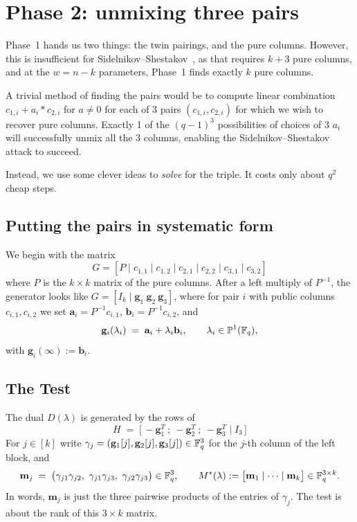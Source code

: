 \section{Phase 2: unmixing three pairs}\label{sec:fastp2}

Phase~1 hands us two things: the twin
pairings, and the pure columns. However, this is insufficient for Sidelnikov--Shestakov~\cite{sidelnikov1992insecurity}, 
as that requires $k+3$ pure columns, and at the $w=n-k$ parameters, Phase~1 finds exactly $k$
pure columns. 

A trivial method of finding the pairs would be to compute linear combination $c_{1,i}+a_i*c_{2,i}$ for $a \neq 0$
 for each of 3 
pairs $(c_{1,i}, c_{2,i})$ for which we wish to recover pure columns. Exactly 1 of the $(q-1)^3$ possibilities of 
choices of 3 $a_i$ will 
successfully unmix all the 3 columns, enabling the Sidelnikov--Shestakov attack to succeed.

Instead, we use some clever ideas to \emph{solve} for the triple.
It costs only about $q^2$ cheap steps.

\subsection{Putting the pairs in systematic form}
We begin with the matrix \[G = [ P \mid c_{1,1} \mid c_{1,2} \mid c_{2,1} \mid c_{2,2} \mid c_{3,1} \mid c_{3,2}]\] where
 $P$ is the $k \times k$
matrix of the pure columns. After
a left multiply of $P^{-1}$, the generator looks like
$G=[I_k \mid \mathbf{g}_1\ \mathbf{g}_2\ \mathbf{g}_3]$,
where for pair $i$ with public columns $c_{i,1}, c_{i,2}$ we set
$\mathbf{a}_i = P^{-1} c_{i,1}$,
$\mathbf{b}_i = P^{-1} c_{i,2}$, and
\[
    \mathbf{g}_i(\lambda_i) \;=\; \mathbf{a}_i + \lambda_i \mathbf{b}_i,
    \qquad \lambda_i \in \mathbb{P}^1(\mathbb{F}_q),
\]
with $\mathbf{g}_i(\infty) := \mathbf{b}_i$. 

\subsection{The Test}

The dual $D(\lambda)$ is generated by the rows of
\[
    H \;=\; \bigl[\, -\mathbf{g}_1^{T}\ ;\ -\mathbf{g}_2^{T}\ ;\
    -\mathbf{g}_3^{T} \;\big|\; I_3 \,\bigr]
\]
 For $j \in [k]$
write $\gamma_j = (\mathbf{g}_1[j], \mathbf{g}_2[j],
\mathbf{g}_3[j]) \in \mathbb{F}_q^3$ for the $j$-th column of the left
block, and
\[
    \mathbf{m}_j \;=\; \bigl(\gamma_{j1}\gamma_{j2},\
    \gamma_{j1}\gamma_{j3},\ \gamma_{j2}\gamma_{j3}\bigr) \in \mathbb{F}_q^3,
    \qquad
    M^{*}(\lambda) := \bigl[\mathbf{m}_1 \mid \cdots \mid
    \mathbf{m}_k\bigr] \in \mathbb{F}_q^{3\times k}.
\]
In words, $\mathbf{m}_j$ is just the three pairwise products of
the entries of $\gamma_j$. The test is about the rank of this
$3 \times k$ matrix.

